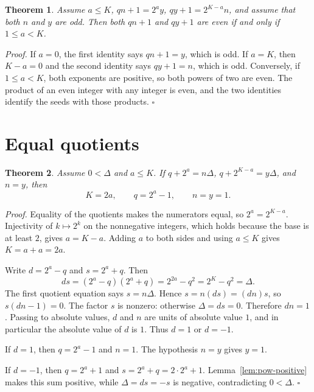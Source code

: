 \documentclass[11pt,letterpaper]{article}
\newtheorem{theorem}{Theorem}
\newenvironment{proof}{\noindent\textit{Proof.}}{\hfill\(\square\)}
\begin{document}
\begin{theorem}
\label{thm:exact}
Assume \(a\le K\), \(qn+1=2^{a}y\), \(qy+1=2^{K-a}n\), and assume that both \(n\) and \(y\) are odd. Then both \(qn+1\) and \(qy+1\) are even if and only if \(1\le a<K\).
\end{theorem}

\begin{proof}
If \(a=0\), the first identity says \(qn+1=y\), which is odd. If \(a=K\), then \(K-a=0\) and the second identity says \(qy+1=n\), which is odd. Conversely, if \(1\le a<K\), both exponents are positive, so both powers of two are even. The product of an even integer with any integer is even, and the two identities identify the seeds with those products.
\end{proof}

\section{Equal quotients}

\begin{theorem}
\label{thm:equal}
Assume \(0<\Delta\) and \(a\le K\). If \(q+2^{a}=n\Delta\), \(q+2^{K-a}=y\Delta\), and \(n=y\), then
\[
K=2a,\qquad q=2^{a}-1,\qquad n=y=1.
\]
\end{theorem}

\begin{proof}
Equality of the quotients makes the numerators equal, so \(2^{a}=2^{K-a}\). Injectivity of \(k\mapsto 2^{k}\) on the nonnegative integers, which holds because the base is at least \(2\), gives \(a=K-a\). Adding \(a\) to both sides and using \(a\le K\) gives \(K=a+a=2a\).

Write \(d=2^{a}-q\) and \(s=2^{a}+q\). Then
\[
ds=(2^{a}-q)(2^{a}+q)=2^{2a}-q^{2}=2^{K}-q^{2}=\Delta.
\]
The first quotient equation says \(s=n\Delta\). Hence \(s=n(ds)=(dn)s\), so \(s(dn-1)=0\). The factor \(s\) is nonzero: otherwise \(\Delta=ds=0\). Therefore \(dn=1\). Passing to absolute values, \(d\) and \(n\) are units of absolute value \(1\), and in particular the absolute value of \(d\) is \(1\). Thus \(d=1\) or \(d=-1\).

If \(d=1\), then \(q=2^{a}-1\) and \(n=1\). The hypothesis \(n=y\) gives \(y=1\).

If \(d=-1\), then \(q=2^{a}+1\) and \(s=2^{a}+q=2\cdot 2^{a}+1\). Lemma~\ref{lem:pow-positive} makes this sum positive, while \(\Delta=ds=-s\) is negative, contradicting \(0<\Delta\).
\end{proof}
\end{document}
